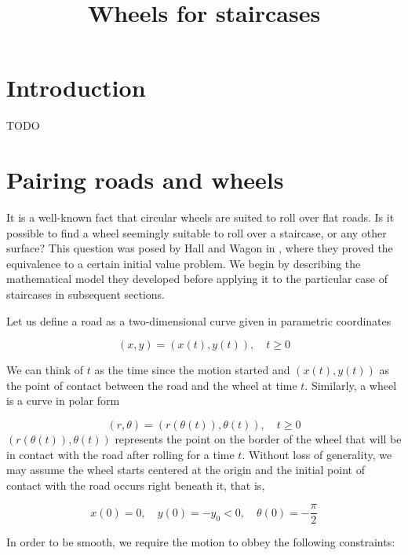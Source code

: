 \documentclass{article}
\theoremstyle{theorem}
\theoremstyle{theorem}
\begin{document}
\title{Wheels for staircases} \date{}
\maketitle

\section{Introduction}

TODO

\section{Pairing roads and wheels }
\label{sec:model}

It is a well-known fact that circular wheels are suited to roll over
flat roads. Is it possible to find a wheel seemingly suitable to roll
over a staircase, or any other surface? This question was posed by
Hall and Wagon in \cite{hall-wagon}, where they proved the equivalence
to a certain initial value problem. We begin by describing the
mathematical model they developed before applying it to the particular
case of staircases in subsequent sections.

Let us define a road as a two-dimensional curve given in parametric
coordinates

\begin{equation}
  \label{eq:road}
  (x, y) = (x(t), y(t)), \quad t \geq 0
\end{equation}

We can think of $t$ as the time since the motion started and $(x(t),
y(t))$ as the point of contact between the road and the wheel at time
$t$. Similarly, a wheel is a curve in polar form

\begin{equation}
  \label{eq:wheel}
  (r, \theta) = (r(\theta(t)), \theta(t)), \quad t \geq 0
\end{equation}
$(r(\theta(t)), \theta(t))$ represents the point on the border of the
wheel that will be in contact with the road after rolling for a time
$t$. Without loss of generality, we may assume the wheel starts
centered at the origin and the initial point of contact with the road
occurs right beneath it, that is,

\begin{equation}
  x(0)=0,\quad y(0)=-y_0 < 0, \quad \theta(0) = -\frac{\pi}{2}
\end{equation}

In order to be smooth, we require the motion to obbey the following constraints:\\
\end{document}
